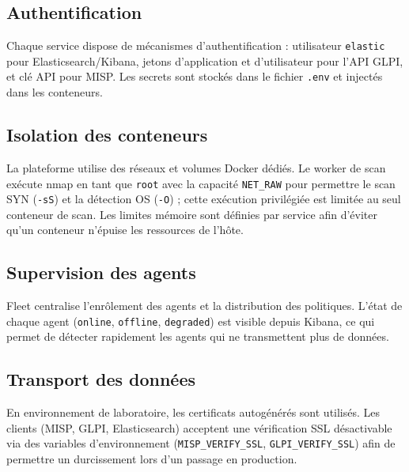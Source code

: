 \documentclass[11pt,a4paper]{article}
\begin{document}
\subsection{Authentification}

Chaque service dispose de m\'ecanismes d'authentification : utilisateur
\texttt{elastic} pour Elasticsearch/Kibana, jetons d'application et
d'utilisateur pour l'API GLPI, et cl\'e API pour MISP. Les secrets sont
stock\'es dans le fichier \texttt{.env} et inject\'es dans les conteneurs.

\subsection{Isolation des conteneurs}

La plateforme utilise des r\'eseaux et volumes Docker d\'edi\'es. Le worker
de scan ex\'ecute nmap en tant que \texttt{root} avec la capacit\'e
\texttt{NET\_RAW} pour permettre le scan SYN (\texttt{-sS}) et la d\'etection
OS (\texttt{-O}) ; cette ex\'ecution privil\'egi\'ee est limit\'ee au seul
conteneur de scan. Les limites m\'emoire sont d\'efinies par service afin
d'\'eviter qu'un conteneur n'\'epuise les ressources de l'h\^ote.

\subsection{Supervision des agents}

Fleet centralise l'enr\^olement des agents et la distribution des politiques.
L'\'etat de chaque agent (\texttt{online}, \texttt{offline}, \texttt{degraded})
est visible depuis Kibana, ce qui permet de d\'etecter rapidement les agents
qui ne transmettent plus de donn\'ees.

\subsection{Transport des donn\'ees}

En environnement de laboratoire, les certificats autog\'en\'er\'es sont
utilis\'es. Les clients (MISP, GLPI, Elasticsearch) acceptent une
v\'erification SSL d\'esactivable via des variables d'environnement
(\texttt{MISP\_VERIFY\_SSL}, \texttt{GLPI\_VERIFY\_SSL}) afin de permettre un
durcissement lors d'un passage en production.

\clearpage

\end{document}
